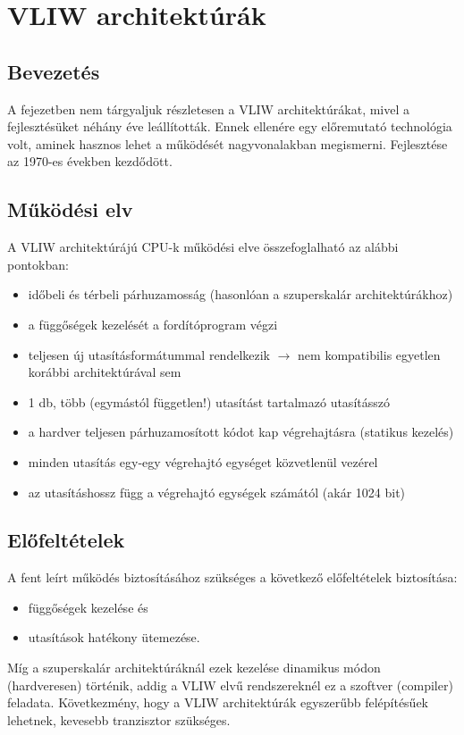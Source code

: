 
\chapter{VLIW architektúrák} \label{vliw}

\section{Bevezetés}
A fejezetben nem tárgyaljuk részletesen a VLIW architektúrákat, mivel a fejlesztésüket néhány éve leállították.
Ennek ellenére egy előremutató technológia volt, aminek hasznos lehet a működését nagyvonalakban megismerni.
Fejlesztése az 1970-es években kezdődött.

\section{Működési elv}
A VLIW architektúrájú CPU-k működési elve összefoglalható az alábbi pontokban:
\begin{itemize}
    \item időbeli és térbeli párhuzamosság (hasonlóan a szuperskalár architektúrákhoz)
    \item a függőségek kezelését a fordítóprogram végzi
    \item teljesen új utasításformátummal rendelkezik $\rightarrow$ nem kompatibilis egyetlen korábbi architektúrával sem
    \item 1 db, több (egymástól független!) utasítást tartalmazó utasításszó
    \item a hardver teljesen párhuzamosított kódot kap végrehajtásra (statikus kezelés)
    \item minden utasítás egy-egy végrehajtó egységet közvetlenül vezérel
    \item az utasításhossz függ a végrehajtó egységek számától (akár 1024 bit)
\end{itemize}

\section{Előfeltételek}
A fent leírt működés biztosításához szükséges a következő előfeltételek biztosítása:
\begin{itemize}
    \item függőségek kezelése és
    \item utasítások hatékony ütemezése.
\end{itemize}
Míg a szuperskalár architektúráknál ezek kezelése dinamikus módon (hardveresen) történik, addig a VLIW elvű rendszereknél ez a szoftver (compiler) feladata.
Következmény, hogy a VLIW architektúrák egyszerűbb felépítésűek lehetnek, kevesebb tranzisztor szükséges.

